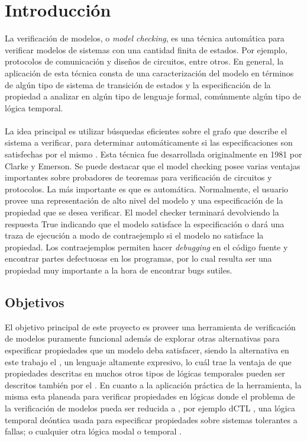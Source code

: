 \chapter{Introducción}
\noindent La verificación de modelos, o \emph{model checking}, es una técnica automática para verificar modelos de sistemas con una cantidad finita de estados. Por ejemplo, protocolos de comunicación y diseños de circuitos, entre otros. En general, la aplicación de esta técnica consta de una caracterización del modelo en términos de algún tipo de sistema de transición de estados y la especificación de la propiedad a analizar en algún tipo de lenguaje formal, comúnmente algún tipo de lógica temporal.\\
\\
\noindent La idea principal es utilizar búsquedas eficientes sobre el grafo que describe el sistema a verificar, para determinar automáticamente si las especificaciones son satisfechas por el mismo \cite{Clarke:5}. Esta técnica fue desarrollada originalmente en 1981 por Clarke y Emerson. Se puede destacar que el model checking posee varias ventajas importantes sobre probadores de teoremas para verificación de circuitos y protocolos. La más importante es que es automática. Normalmente, el usuario provee una representación de alto nivel del modelo y una especificación de la propiedad que se desea verificar. El model checker terminará devolviendo la respuesta True indicando que el modelo satisface la especificación o dará una traza de ejecución a modo de contraejemplo si el modelo no satisface la propiedad. Los contraejemplos permiten hacer \emph{debugging} en el código fuente y encontrar partes defectuosas en los programas, por lo cual resulta ser una propiedad muy importante a la hora de encontrar bugs sutiles.

\section{Objetivos}
El objetivo principal de este proyecto es proveer una herramienta de verificación de modelos puramente funcional además de explorar otras alternativas para especificar propiedades que un modelo deba satisfacer, siendo la alternativa en este trabajo el {\mucalculo}, un lenguaje altamente expresivo, lo cuál trae la ventaja de que propiedades descritas en muchos otros tipos de lógicas temporales pueden ser descritos también por el {\mucalculo}. En cuanto a la aplicación práctica de la herramienta, la misma esta planeada para verificar propiedades en lógicas donde el problema de la verificación de modelos pueda ser reducida a {\mucalculo}, por ejemplo dCTL \cite{Castro:9}, una lógica temporal deóntica usada para especificar propiedades sobre sistemas tolerantes a fallas; o cualquier otra lógica modal o temporal \cite{Baier:2}.

